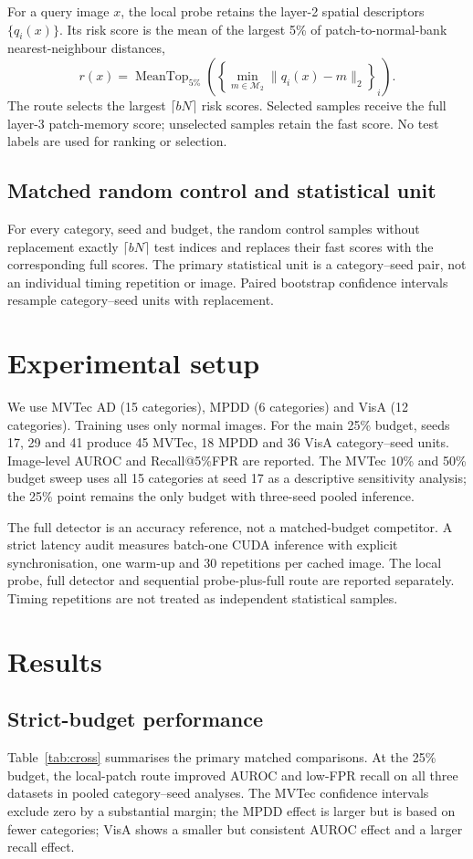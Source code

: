 \documentclass[preprint,12pt]{elsarticle}
\begin{document}
For a query image $x$, the local probe retains the layer-2 spatial descriptors $\{q_i(x)\}$. Its risk score is the mean of the largest 5\% of patch-to-normal-bank nearest-neighbour distances,
\begin{equation}
 r(x)=\operatorname{MeanTop}_{5\%}\left(\left\{\min_{m\in\mathcal{M}_2}\|q_i(x)-m\|_2\right\}_i\right).
\end{equation}
The route selects the largest $\lceil bN\rceil$ risk scores. Selected samples receive the full layer-3 patch-memory score; unselected samples retain the fast score. No test labels are used for ranking or selection.

\subsection{Matched random control and statistical unit}
For every category, seed and budget, the random control samples without replacement exactly $\lceil bN\rceil$ test indices and replaces their fast scores with the corresponding full scores. The primary statistical unit is a category--seed pair, not an individual timing repetition or image. Paired bootstrap confidence intervals resample category--seed units with replacement.

\section{Experimental setup}
We use MVTec AD (15 categories), MPDD (6 categories) and VisA (12 categories). Training uses only normal images. For the main 25\% budget, seeds 17, 29 and 41 produce 45 MVTec, 18 MPDD and 36 VisA category--seed units. Image-level AUROC and Recall@5\%FPR are reported. The MVTec 10\% and 50\% budget sweep uses all 15 categories at seed 17 as a descriptive sensitivity analysis; the 25\% point remains the only budget with three-seed pooled inference.

The full detector is an accuracy reference, not a matched-budget competitor. A strict latency audit measures batch-one CUDA inference with explicit synchronisation, one warm-up and 30 repetitions per cached image. The local probe, full detector and sequential probe-plus-full route are reported separately. Timing repetitions are not treated as independent statistical samples.

\section{Results}
\subsection{Strict-budget performance}
Table~\ref{tab:cross} summarises the primary matched comparisons. At the 25\% budget, the local-patch route improved AUROC and low-FPR recall on all three datasets in pooled category--seed analyses. The MVTec confidence intervals exclude zero by a substantial margin; the MPDD effect is larger but is based on fewer categories; VisA shows a smaller but consistent AUROC effect and a larger recall effect.
\end{document}
